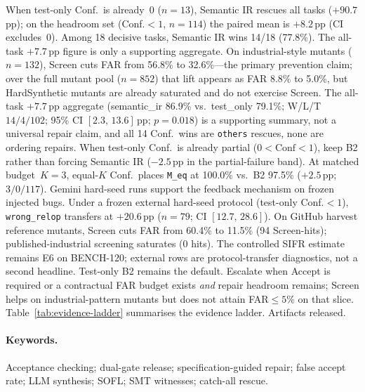 When test-only Conf.\ is already~$0$ ($n{=}13$), Semantic IR rescues all tasks
(${+}90.7$\,pp); on the headroom set (Conf.${<}1$, $n{=}114$) the paired mean
is ${+}8.2$\,pp (CI excludes~0).
Among 18 decisive tasks, Semantic IR wins 14/18 (77.8\%).
The all-task ${+}7.7$\,pp figure is only a supporting aggregate.
On industrial-style mutants ($n{=}132$), Screen cuts FAR from 56.8\% to
32.6\%---the primary prevention claim; over the full mutant pool ($n{=}852$)
that lift appears as FAR 8.8\% to 5.0\%, but HardSynthetic mutants are already
saturated and do not exercise Screen.
The all-task ${+}7.7$\,pp aggregate (semantic\_ir 86.9\% vs.\ test\_only 79.1\%;
W/L/T $14/4/102$; 95\% CI $[2.3,\,13.6]$\,pp; $p{=}0.018$) is a supporting
summary, not a universal repair claim, and all 14 Conf.\ wins are
\texttt{others} rescues, none are ordering repairs.
When test-only Conf.\ is already partial ($0{<}\mathrm{Conf}{<}1$), keep B2
rather than forcing Semantic IR (${-}2.5$\,pp in the partial-failure band).
At matched budget~$K{=}3$, equal-$K$ Conf.\ places \texttt{M\_eq} at 100.0\%
vs.\ B2 97.5\% (${+}2.5$\,pp; $3/0/117$).
Gemini hard-seed runs support the feedback mechanism on frozen injected bugs.
Under a frozen external hard-seed protocol (test-only Conf.${<}1$),
\texttt{wrong\_relop} transfers at ${+}20.6$\,pp ($n{=}79$; CI $[12.7,\,28.6]$).
On GitHub harvest reference mutants, Screen cuts FAR from 60.4\% to 11.5\%
(94 Screen-hits); published-industrial screening saturates (0 hits).
The controlled SIFR estimate remains E6 on BENCH-120; external rows are
protocol-transfer diagnostics, not a second headline.
Test-only B2 remains the default.
Escalate when Accept is required or a contractual FAR budget exists \emph{and}
repair headroom remains; Screen helps on industrial-pattern mutants but does
not attain FAR${\le}5\%$ on that slice.
Table~\ref{tab:evidence-ladder} summarises the evidence ladder.
Artifacts released.

\paragraph{Keywords.}
Acceptance checking; dual-gate release; specification-guided repair; false
accept rate; LLM synthesis; SOFL; SMT witnesses; catch-all rescue.
